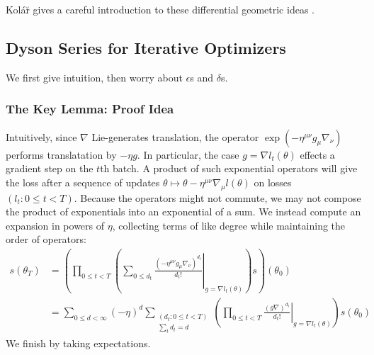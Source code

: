 \documentclass{article}
\theoremstyle{plain}
\theoremstyle{definition}
\newcommand{\wrap}[1]{\left(#1\right)}
\begin{document}
        Kol\'{a}\u{r} gives a careful introduction to these differential
        geometric ideas .

    \subsection{Dyson Series for Iterative Optimizers}
        We first give intuition, then worry about $\epsilon$s and $\delta$s.
        \subsubsection*{The Key Lemma: Proof Idea}
            Intuitively, since $\nabla$ Lie-generates translation, the operator
            $
                \exp\wrap{
                    -\eta^{\mu\nu} g_\mu \nabla_\nu
                }
            $
            performs translatation by $-\eta g$.  In particular, the case
            $g=\nabla l_t(\theta)$ effects a gradient step on the $t$th batch.
            A product of such exponential operators will give the loss after a
            sequence of updates $\theta \mapsto \theta - \eta^{\mu\nu}
            \nabla_\mu l(\theta)$ on losses $(l_t: 0\leq t < T)$.  Because the
            operators might not commute, we may not compose the product of
            exponentials into an exponential of a sum.  We instead compute an
            expansion in powers of $\eta$, collecting terms of like degree
            while maintaining the order of operators:
            \begin{align*}
                s(\theta_T)
                &=
                \wrap{\prod_{0\leq t<T} \wrap{
                    \sum_{0\leq d_t}
                        \left.
                            \frac{(-\eta^{\mu\nu} g_\mu \nabla_\nu)^{d_t}}{d_t!}
                        \right|_{g=\nabla l_t(\theta)}
                }
                s} (\theta_0) \\
                &= 
                \sum_{0\leq d < \infty} (-\eta)^d
                \sum_{\substack{(d_t: 0\leq t<T) \\ \sum_t d_t = d}}
                \wrap{
                    \prod_{0 \leq t < T} \left.
                        \frac{(g \nabla)^{d_t}}{d_t!}
                    \right|_{g=\nabla l_t(\theta)}
                } s (\theta_0)
            \end{align*}
            We finish by taking expectations.
\end{document}
